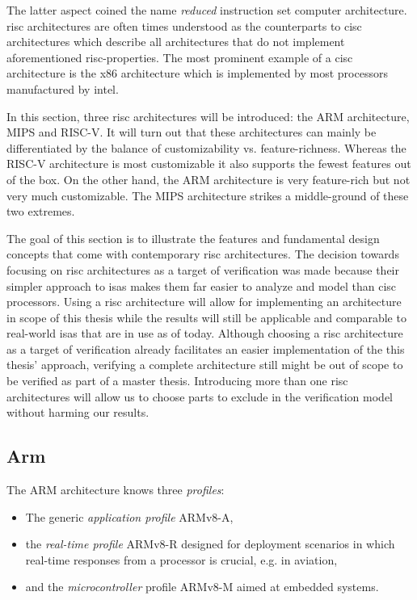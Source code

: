 The latter aspect coined the name \textit{reduced} instruction set computer architecture.
\gls{risc} architectures are often times understood as the counterparts to \gls{cisc} architectures which describe all architectures that do not implement aforementioned \gls{risc}-properties.
The most prominent example of a \gls{cisc} architecture is the x86 architecture which is implemented by most processors manufactured by intel.

In this section, three \gls{risc} architectures will be introduced: the ARM architecture, MIPS and RISC-V.
It will turn out that these architectures can mainly be differentiated by the balance of customizability vs. feature-richness.
Whereas the RISC-V architecture is most customizable it also supports the fewest features out of the box.
On the other hand, the ARM architecture is very feature-rich but not very much customizable.
The MIPS architecture strikes a middle-ground of these two extremes.

The goal of this section is to illustrate the features and fundamental design concepts that come with contemporary \gls{risc} architectures.
The decision towards focusing on \gls{risc} architectures as a target of verification was made because their simpler approach to \glspl{isa} makes them far easier to analyze and model than \gls{cisc} processors.
Using a \gls{risc} architecture will allow for implementing an architecture in scope of this thesis while the results will still be applicable and comparable to real-world \glspl{isa} that are in use as of today.
Although choosing a \gls{risc} architecture as a target of verification already facilitates an easier implementation of the this thesis' approach, verifying a complete architecture still might be out of scope to be verified as part of a master thesis.
Introducing more than one \gls{risc} architectures will allow us to choose parts to exclude in the verification model without harming our results.

\subsection{Arm}

The ARM architecture knows three \textit{profiles}:
\begin{itemize}
    \item The generic \textit{application profile} ARMv8-A,
    \item the \textit{real-time profile} ARMv8-R designed for deployment scenarios in which real-time responses from a processor is crucial, e.g. in aviation,
    \item and the \textit{microcontroller} profile ARMv8-M aimed at embedded systems.
\end{itemize}

